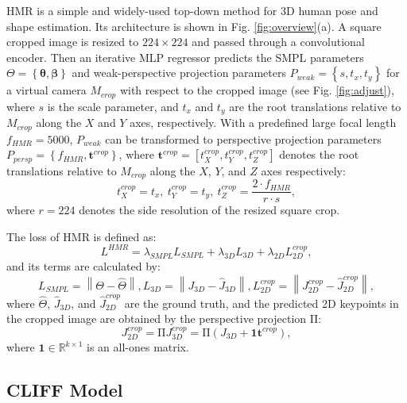 \documentclass[runningheads]{llncs}
\begin{document}
HMR \cite{kanazawa2018end} is a simple and widely-used top-down method for 3D human pose and shape estimation.
Its architecture is shown in Fig. \ref{fig:overview}(a).
A square cropped image is resized to $224 \times 224$ and passed through a convolutional encoder.
Then an iterative MLP regressor predicts the SMPL parameters $\Theta = {\left\{ \bm{\theta}, \bm{\beta} \right\}}$ and weak-perspective projection parameters $P_{weak} = {\left\{ s, t_x, t_y \right\}}$ for a virtual camera $M_{crop}$ with respect to the cropped image (see Fig. \ref{fig:adjust}), where $s$ is the scale parameter, and $t_x$ and $t_y$ are the root translations relative to $M_{crop}$ along the $X$ and $Y$ axes, respectively.
With a predefined large focal length $f_{HMR} = 5000$, $P_{weak}$ can be transformed to perspective projection parameters $P_{persp} = {\left\{ f_{HMR}, \mathbf{t}^{crop} \right\}}$, where $\mathbf{t}^{crop} = [t^{crop}_X, t^{crop}_Y, t^{crop}_Z]$ denotes the root translations relative to $M_{crop}$ along the $X$, $Y$, and $Z$ axes respectively:
\begin{equation}
	\label{eq:convert_crop}
	t^{crop}_X = t_x, \
	t^{crop}_Y = t_y, \
	t^{crop}_Z = \frac{2 \cdot f_{HMR}}{r \cdot s},
\end{equation}
where $r=224$ denotes the side resolution of the resized square crop.

The loss of HMR is defined as:
\begin{equation}
	L^{HMR} = \lambda_{SMPL}L_{SMPL}+\lambda_{3D}L_{3D}+\lambda_{2D}L_{2D}^{crop},
\end{equation}
and its terms are calculated by:
\begin{equation}
	L_{SMPL} = \left \| \Theta - \hat{\Theta} \right \|,
	L_{3D} =   \left \| J_{3D} - \hat{J}_{3D} \right \|,
	L_{2D}^{crop} =   \left \| J_{2D}^{crop} - \hat{J}_{2D}^{crop} \right \|,
\end{equation}
where $\hat{\Theta}$, $\hat{J}_{3D}$, and $\hat{J}_{2D}^{crop}$ are the ground truth, and the predicted 2D keypoints in the cropped image are obtained by the perspective projection $\mathrm{\Pi}$:
\begin{equation}
	J_{2D}^{crop} = \mathrm{\Pi} J_{3D}^{crop}
				  = \mathrm{\Pi} (J_{3D} + \mathbf{1} \mathbf{t}^{crop}),
\end{equation}
where $\mathbf{1} \in \mathbb{R}^{k\times1}$ is an all-ones matrix.

\subsection{CLIFF Model}
\end{document}
